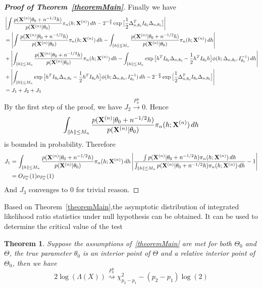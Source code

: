\documentclass[3p]{elsarticle}
\theoremstyle{plain}
\newtheorem{theorem}{\quad\quad Theorem}
\theoremstyle{definition}
\theoremstyle{remark}
\begin{document}
\begin{proof}[\textbf{Proof of Theorem~\ref{theoremMain}}]
Finally we have
\begin{equation*}
    \begin{aligned}
        &\left|\int \frac{p(\mathbf{X}^{(n)}|\theta_0+n^{-1/2}h)}{p(\mathbf{X}^{(n)}|\theta_0)}\pi_n (h;\mathbf{X}^{(n)}) \, dh-2^{-\frac{p}{2}}\exp\big[\frac{1}{2}\Delta_{n,\theta_0}^T I_{\theta_0}\Delta_{n,\theta_0}\big]
 \right|\\
        &=\left|\int \frac{p(\mathbf{X}^{(n)}|\theta_0+n^{-1/2}h)}{p(\mathbf{X}^{(n)}|\theta_0)}\pi_n (h;\mathbf{X}^{(n)}) \, dh-\int_{\|h\|\leq M_n}\frac{p(\mathbf{X}^{(n)}|\theta_0+n^{-1/2}h)}{p(\mathbf{X}^{(n)}|\theta_0)}\pi_n (h;\mathbf{X}^{(n)}) \, dh\right|\\
        &+\left|\int_{\|h\|\leq M_n} \frac{p(\mathbf{X}^{(n)}|\theta_0+n^{-1/2}h)}{p(\mathbf{X}^{(n)}|\theta_0)}\pi_n (h;\mathbf{X}^{(n)}) \, dh -\int_{\|h\|\leq M_n} \exp\big[h^T I_{\theta_0}\Delta_{n,\theta_0}-\frac{1}{2}h^T I_{\theta_0}h\big]\phi(h;\Delta_{n,\theta_0},I_{\theta_0}^{-1})\, dh\right|\\
        &+\left| \int_{\|h\|\leq M_n} \exp\big[h^T I_{\theta_0}\Delta_{n,\theta_0}-\frac{1}{2}h^T I_{\theta_0}h\big]\phi(h;\Delta_{n,\theta_0},I_{\theta_0}^{-1})\, dh-2^{-\frac{p}{2}}\exp\big[\frac{1}{2}\Delta_{n,\theta_0}^T I_{\theta_0}\Delta_{n,\theta_0}\big]
 \right|\\
        &=J_1+J_2+J_3
\end{aligned}
\end{equation*}
By the first step of the proof, we have $J_2\xrightarrow{P^n_0}0$.
Hence 
$$
\int_{\|h\|\leq M_n} \frac{p(\mathbf{X}^{(n)}|\theta_0+n^{-1/2}h)}{p(\mathbf{X}^{(n)}|\theta_0)}\pi_n (h;\mathbf{X}^{(n)}) \, dh
$$ is bounded in probability. Therefore
\begin{equation*}
\begin{aligned}
    J_1&=
\int_{\|h\|\leq M_n} \frac{p(\mathbf{X}^{(n)}|\theta_0+n^{-1/2}h)}{p(\mathbf{X}^{(n)}|\theta_0)}\pi_n (h;\mathbf{X}^{(n)}) \, dh
\left|\frac{
\int p(\mathbf{X}^{(n)}|\theta_0+n^{-1/2}h)\pi_n (h;\mathbf{X}^{(n)}) \, dh}{\int_{\|h\|\leq M_n} p(\mathbf{X}^{(n)}|\theta_0+n^{-1/2}h)\pi_n (h;\mathbf{X}^{(n)}) \, dh}-1\right|\\
       &=O_{P_0^n}(1)o_{P_0^n}(1)
\end{aligned}
\end{equation*}
And $J_3$ convenges to $0$ for trivial reason.
\end{proof}




Based on Theorem~\ref{theoremMain},the asymptotic distribution of integrated likelihood ratio statistics under null hypothesis can be obtained. It can be used to determine the critical value of the test
\begin{theorem}\label{theoremWilks}
    Suppose the assumptions of~\ref{theoremMain} are met for both $\Theta_0$ and $\Theta$,  the true parameter $\theta_0$ is an interior point of $\Theta$ and a relative interior point of $\Theta_0$, then we have
\begin{equation}
    2\log(\Lambda(X))\overset{P_0^n}{\rightsquigarrow} \chi^2_{p_2-p_1}-(p_2-p_1)\log(2)
\end{equation}

\end{theorem}
\end{document}

